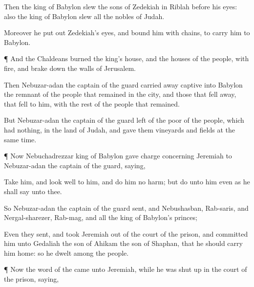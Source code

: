 {Then the
king of
Babylon
slew the
sons of
Zedekiah in
Riblah before his
eyes: also the
king of
Babylon
slew all the
nobles of
Judah.

Moreover he put
out
Zedekiah’s
eyes, and
bound him with
chains, to
carry him to
Babylon.


\par }{\PP {}¶ And the
Chaldeans
burned the
king’s
house, and the
houses of the
people, with
fire, and brake
down the
walls of
Jerusalem.

Then
Nebuzar-adan the
captain of the
guard carried away
captive into
Babylon the
remnant of the
people that
remained in the
city, and those that fell
away, that
fell to him, with the
rest of the
people that
remained.

But
Nebuzar-adan the
captain of the
guard
left of the
poor of the
people, which had
nothing, in the
land of
Judah, and
gave them
vineyards and
fields at the same
time.


\par }{\PP {}¶ Now
Nebuchadrezzar
king of
Babylon gave
charge concerning
Jeremiah
to
Nebuzar-adan the
captain of the
guard,
saying,

Take him, and look
well to him, and
do him no
harm; but
do unto him even as he shall
say unto thee.

So
Nebuzar-adan the
captain of the
guard
sent, and
Nebushasban,
Rab-saris, and
Nergal-sharezer,
Rab-mag, and all the
king of
Babylon’s
princes;

Even they
sent, and
took
Jeremiah out of the
court of the
prison, and
committed him unto
Gedaliah the
son of
Ahikam the
son of
Shaphan, that he should
carry him
home: so he
dwelt
among the
people.


\par }{\PP {}¶ Now the
word of the
{} came unto
Jeremiah, while he was shut
up in the
court of the
prison,
saying,

}
